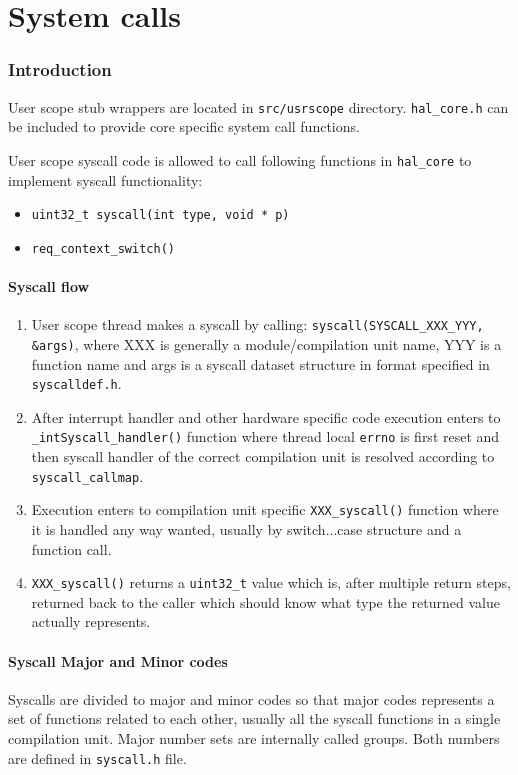 \part{System calls}

\section{Introduction}
User scope stub wrappers are located in \verb+src/usrscope+ directory.
\verb+hal_core.h+ can be included to provide core specific system call
functions.

User scope syscall code is allowed to call following functions in \verb+hal_core+ to
implement syscall functionality:

\begin{itemize}
  \item \verb+uint32_t syscall(int type, void * p)+
  \item \verb+req_context_switch()+
\end{itemize}

\subsection{Syscall flow}

\begin{enumerate}
\item User scope thread makes a syscall by calling:
      \verb+syscall(SYSCALL_XXX_YYY, &args)+, where XXX is generally a
      module/compilation unit name, YYY is a function name and args is a
      syscall dataset structure in format specified in \verb+syscalldef.h+.

\item After interrupt handler and other hardware specific code execution enters
      to \verb+_intSyscall_handler()+ function where thread local \verb+errno+
      is first reset and then syscall handler of the correct compilation unit is
      resolved according to \verb+syscall_callmap+.

\item Execution enters to compilation unit specific \verb+XXX_syscall()+
      function where it is handled any way wanted, usually by switch...case
      structure and a function call.

\item \verb+XXX_syscall()+ returns a \verb+uint32_t+ value which is, after
      multiple return steps, returned back to the caller which should know
      what type the returned value actually represents.
\end{enumerate}


\subsection{Syscall Major and Minor codes}

Syscalls are divided to major and minor codes so that major codes represents a
set of functions related to each other, usually all the syscall functions in a
single compilation unit. Major number sets are internally called groups. Both
numbers are defined in \verb+syscall.h+ file.
